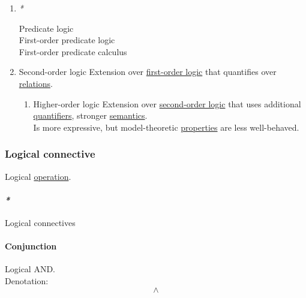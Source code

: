 \documentclass[11pt]{article}
\begin{document}
\begin{enumerate}
\item \emph{*}
\label{sec:org6d877ff}

\label{orgeca9075}Predicate logic\\
\label{orgc5c1677}First-order predicate logic\\
\label{orgc17390e}First-order predicate calculus\\

\item \label{org463dadc}Second-order logic
\label{sec:org78069ba}
Extension over \hyperref[orgbfdb58a]{first-order logic} that quantifies over \hyperref[org711476e]{relations}.\\

\begin{enumerate}
\item \label{org0b5c81c}Higher-order logic
\label{sec:orgb3506b8}
Extension over \hyperref[org463dadc]{second-order logic} that uses additional \hyperref[org56c9794]{quantifiers}, stronger \hyperref[orgbbcc036]{semantics}.\\

Is more expressive, but model-theoretic \hyperref[org85fb3a1]{properties} are less well-behaved.\\
\end{enumerate}
\end{enumerate}

\subsubsection{\label{orga85083a}Logical connective}
\label{sec:org43ef68a}
Logical \hyperref[org1173fe8]{operation}.\\

\paragraph{\emph{*}}
\label{sec:orgbc9b10a}

\label{orgc2786fc}Logical connectives\\

\paragraph{\label{orgc8fbabd}Conjunction}
\label{sec:org51e29cb}
Logical AND.\\

Denotation:\\
$$ \land $$\\
\end{document}
